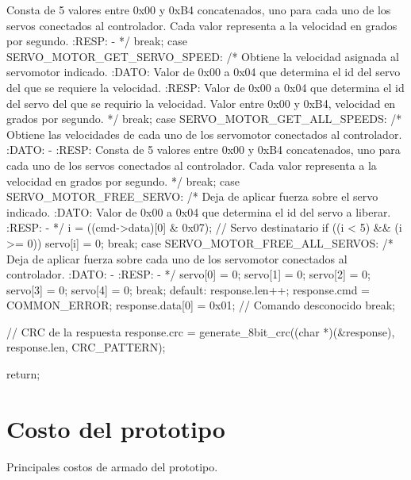 {\begin{verbatimtab}
{{			Consta de 5 valores entre 0x00 y 0xB4 concatenados, uno 
			para cada uno de los servos conectados al controlador. 
			Cada valor representa a la velocidad en grados por segundo.
			:RESP:
			-
			*/
		break;
 		case SERVO_MOTOR_GET_SERVO_SPEED:
			/* Obtiene la velocidad asignada al servomotor indicado.
			:DATO:
			Valor de 0x00 a 0x04 que determina el id del servo del que
			se requiere la velocidad.
			:RESP:
			Valor de 0x00 a 0x04 que determina el id del servo del que 
			se requirio la velocidad. Valor entre 0x00 y 0xB4, velocidad 
			en grados por segundo.
			*/
		break;
 		case SERVO_MOTOR_GET_ALL_SPEEDS:
			/* Obtiene las velocidades de cada uno de los servomotor 
			conectados al controlador.
			:DATO:
			-
			:RESP:
			Consta de 5 valores entre 0x00 y 0xB4 concatenados, uno para 
			cada uno de los servos conectados al controlador. Cada valor 
			representa a la velocidad en grados por segundo.
			*/
		break;
 		case SERVO_MOTOR_FREE_SERVO:
			/* Deja de aplicar fuerza sobre el servo indicado.
			:DATO:
			Valor de 0x00 a 0x04 que determina el id del servo a liberar.
			:RESP:
			-
			*/
			i = ((cmd->data)[0] & 0x07); // Servo destinatario
			if ((i < 5) && (i >= 0))
			{
				servo[i] = 0;
			}
		break;
 		case SERVO_MOTOR_FREE_ALL_SERVOS:
			/* Deja de aplicar fuerza sobre cada uno de los servomotor 
			conectados al controlador.
			:DATO:
			-
			:RESP:
			-
			*/
			servo[0] = 0;
			servo[1] = 0;
			servo[2] = 0;
			servo[3] = 0;
			servo[4] = 0;
		break;
		default:
			response.len++;
			response.cmd = COMMON_ERROR;
			response.data[0] = 0x01; // Comando desconocido
		break;
	}	

	// CRC de la respuesta
	response.crc = generate_8bit_crc((char *)(&response), response.len, CRC_PATTERN);

	return;
}
\end{verbatimtab}
}

\newpage

\section{Costo del prototipo}
\label{hA_costo}

Principales costos de armado del prototipo.

